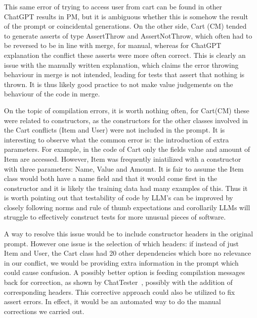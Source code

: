 This same error of trying to access user from cart can be found in other ChatGPT results in PM, but it is ambiguous
whether this is somehow the result of the prompt or coincidental generations. On the other side, Cart (CM) tended to generate
asserts of type AssertThrow and AssertNotThrow, which often had to be reversed to be in line with merge, for manual, whereas for
ChatGPT explanation the conflict these asserts were more often correct. This is clearly an issue with the manually written explanation,
which claims the error throwing behaviour in merge is not intended, leading for tests that assert that nothing is thrown.
It is thus likely good practice to not make value judgements on the behaviour of the code in merge.

On the topic of compilation errors, it is worth nothing often, for Cart(CM) these were related to constructors, as the constructors
for the other classes involved in the Cart conflicts (Item and User) were not included in the prompt. It is interesting
to observe what the common error is: the introduction of extra parameters. For example, in the code of Cart only the fields
value and amount of Item are accessed. However, Item was frequently iniatilized with a constructor with three parameters: Name,
Value and Amount. It is fair to assume the Item class would both have a name field and that it would come first in the constructor
and it is likely the training data had many examples of this. Thus it is worth pointing out that testability of code by LLM's can be
improved by closely following norms and rule of thumb expectations and corollarily LLMs will struggle to effectively construct tests
for more unusual pieces of software.

A way to resolve this issue would be to include constructor headers in the original prompt. However one issue is the selection of which
headers: if instead of just Item and User, the Cart class had 20 other dependencies which bore no relevance in our conflict, we would be
providing extra information in the prompt which could cause confusion. A possibly better option is feeding compilation messages back for correction,
as shown by ChatTester~\cite{kn:chattester}, possibly with the addition of corresponding headers. This corrective approach could also be utilized
to fix assert errors. In effect, it would be an automated way to do the manual corrections we carried out.

